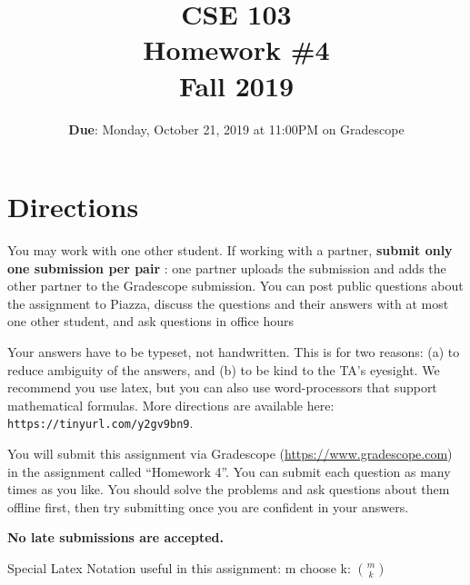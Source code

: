 \documentclass[12pt, oneside]{article}
\title{\bf CSE 103 \\[2ex]
       \Large Homework \#4\\ Fall 2019}
\begin{document}
\date{\textbf{Due}: Monday, October 21, 2019 at 11:00PM on Gradescope}
\maketitle

\section{Directions}
You may work with one other student. If working with a partner,
\textbf{submit only one submission per pair} : one partner uploads the submission and adds the other partner to the Gradescope submission. You can post public questions about the assignment to Piazza, discuss the questions and their answers with at most one other student, and ask questions in office hours

Your answers have to be typeset, not handwritten. This is for two
reasons: (a) to reduce ambiguity of the answers, and (b) to be kind to
the TA's eyesight. We recommend you use latex, but you can also use
word-processors that support mathematical formulas. More directions
are available here: {\tt https://tinyurl.com/y2gv9bn9}.

You will submit this assignment via Gradescope
(\url{https://www.gradescope.com}) in the assignment called ``Homework
4''. You can submit each question as many times as you like. You should solve the problems and ask questions about them offline first, then try submitting once you are confident in your answers. 

\textbf{No late submissions are accepted.}

Special Latex Notation useful in this assignment: m choose k: ${m
  \choose k}$
  \newpage
\end{document}
